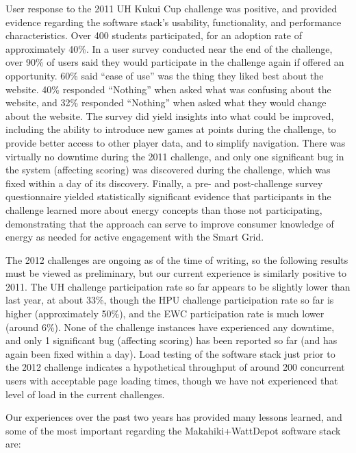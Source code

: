 User response to the 2011 UH Kukui Cup challenge was positive, and provided evidence regarding the software stack's usability, functionality, and performance characteristics.   Over 400 students participated, for an adoption rate of approximately 40\%.  In a user survey conducted near the end of the challenge, over 90\% of users said they would participate in the challenge again if offered an opportunity.  60\%  said ``ease of use'' was the thing they liked best about the website.  40\% responded ``Nothing'' when asked what was confusing about the website, and 32\% responded ``Nothing'' when asked what they would change about the website.  The survey did yield insights into what could be improved, including the ability to introduce new games at points during the challenge, to provide better access to other player data, and to simplify navigation.  There was virtually no downtime during the 2011 challenge, and only one significant bug in the system (affecting scoring) was discovered during the challenge, which was fixed within a day of its discovery.  Finally, a pre- and post-challenge survey questionnaire yielded statistically significant evidence that participants in the challenge learned more about energy concepts than those not participating, demonstrating that the approach can serve to improve consumer knowledge of energy as needed for active engagement with the Smart Grid.


The 2012 challenges are ongoing as of the time of writing, so the following results must be viewed as preliminary, but our current experience is similarly positive to 2011.  The UH challenge participation rate so far appears to be slightly lower than last year, at about 33\%, though the HPU challenge participation rate so far is higher (approximately 50\%), and the EWC participation rate is much lower (around 6\%). None of the challenge instances have experienced any downtime, and only 1 significant bug (affecting scoring) has been reported so far (and has again been fixed within a day).  Load testing of the software stack just prior to the 2012 challenge indicates a hypothetical throughput of around 200 concurrent users with acceptable page loading times, though we have not experienced that level of load in the current challenges. 

Our experiences over the past two years has provided many lessons learned, and some of the most important regarding the Makahiki+WattDepot software stack are:

